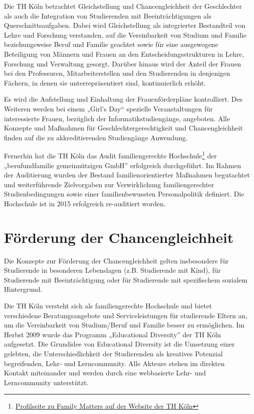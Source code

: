 Die TH Köln betrachtet Gleichstellung und Chancengleichheit der
Geschlechter als auch die Integration von Studierenden mit
Beeinträchtigungen als Querschnittsaufgaben. Dabei wird Gleichstellung
als integrierter Bestandteil von Lehre und Forschung verstanden, auf die
Vereinbarkeit von Studium und Familie beziehungsweise Beruf und Familie
geachtet sowie für eine ausgewogene Beteiligung von Männern und Frauen
an den Entscheidungsstrukturen in Lehre, Forschung und Verwaltung
gesorgt. Darüber hinaus wird der Anteil der Frauen bei den Professuren,
Mitarbeiterstellen und den Studierenden in denjenigen Fächern, in denen
sie unterrepräsentiert sind, kontinuierlich erhöht.

Es wird die Aufstellung und Einhaltung der Frauenförderpläne
kontrolliert. Des Weiteren werden bei einem „Girl's Day`` spezielle
Veranstaltungen für interessierte Frauen, bezüglich der
Informatikstudiengänge, angeboten. Alle Konzepte und Maßnahmen für
Geschlechtergerechtigkeit und Chancengleichheit finden auf die zu
akkreditierenden Studiengänge Anwendung.

Fernerhin hat die TH Köln das Audit familiengerechte
Hochschule\footnote{\href{https://www.th-koeln.de/hochschule/familienfreundlichkeit_3759.php}{Profilseite
  zu Family Matters auf der Website der TH Köln}} der „berufundfamilie
gemeinnützigen GmbH'' erfolgreich durchgeführt. Im Rahmen der
Auditierung wurden der Bestand familienorientierter Maßnahmen
begutachtet und weiterführende Zielvorgaben zur Verwirklichung
familiengerechter Studienbedingungen sowie einer familienbewussten
Personalpolitik definiert. Die Hochschule ist in 2015 erfolgreich
re-auditiert worden.

\section{Förderung der
Chancengleichheit}\label{fuxf6rderung-der-chancengleichheit}

Die Konzepte zur Förderung der Chancengleichheit gelten insbesondere für
Studierende in besonderen Lebenslagen (z.B. Studierende mit Kind), für
Studierende mit Beeinträchtigung oder für Studierende mit spezifischem
sozialem Hintergrund.

Die TH Köln versteht sich als familiengerechte Hochschule und bietet
verschiedene Beratungsangebote und Serviceleistungen für studierende
Eltern an, um die Vereinbarkeit von Studium/Beruf und Familie besser zu
ermöglichen. Im Herbst 2009 wurde das Programm „Educational Diversity''
der TH Köln aufgesetzt. Die Grundidee von Educational Diversity ist die
Umsetzung einer gelebten, die Unterschiedlichkeit der Studierenden als
kreatives Potenzial begreifenden, Lehr- und Lerncommunity. Alle Akteure
stehen im direkten Kontakt miteinander und werden durch eine webbasierte
Lehr- und Lerncommunity unterstützt.

